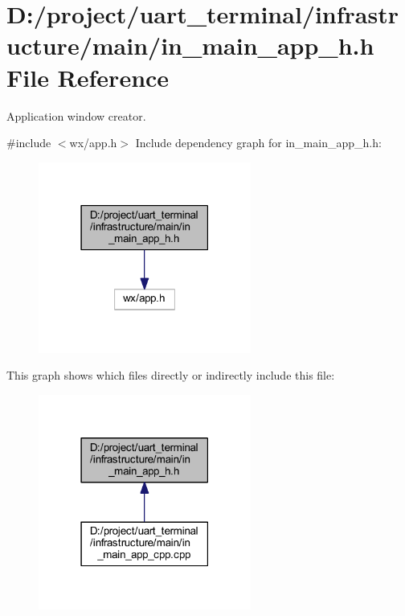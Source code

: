 \section{D\+:/project/uart\+\_\+terminal/infrastructure/main/in\+\_\+main\+\_\+app\+\_\+h.h File Reference}
\label{in__main__app__h_8h}


Application window creator.  


{\ttfamily \#include $<$wx/app.\+h$>$}\newline
Include dependency graph for in\+\_\+main\+\_\+app\+\_\+h.\+h\+:
\nopagebreak
\begin{figure}[H]
\begin{center}
\leavevmode
\includegraphics[width=198pt]{in__main__app__h_8h__incl}
\end{center}
\end{figure}
This graph shows which files directly or indirectly include this file\+:
\nopagebreak
\begin{figure}[H]
\begin{center}
\leavevmode
\includegraphics[width=198pt]{in__main__app__h_8h__dep__incl}
\end{center}
\end{figure}
